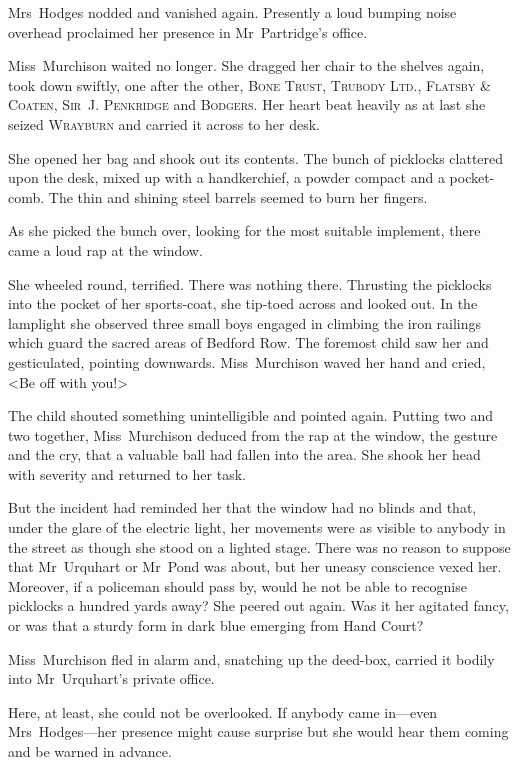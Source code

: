 Mrs~Hodges nodded and vanished again. Presently a loud bumping noise overhead proclaimed her presence in Mr~Partridge's office.

Miss~Murchison waited no longer. She dragged her chair to the shelves again, took down swiftly, one after the other, \textsc{Bone Trust, Trubody Ltd., Flatsby \& Coaten, Sir~J. Penkridge} and \textsc{Bodgers}. Her heart beat heavily as at last she seized \textsc{Wrayburn} and carried it across to her desk.

She opened her bag and shook out its contents. The bunch of picklocks clattered upon the desk, mixed up with a handkerchief, a powder compact and a pocket-comb. The thin and shining steel barrels seemed to burn her fingers.

As she picked the bunch over, looking for the most suitable implement, there came a loud rap at the window.

She wheeled round, terrified. There was nothing there. Thrusting the picklocks into the pocket of her sports-coat, she tip-toed across and looked out. In the lamplight she observed three small boys engaged in climbing the iron railings which guard the sacred areas of Bedford Row. The foremost child saw her and gesticulated, pointing downwards. Miss~Murchison waved her hand and cried, <Be off with you!>

The child shouted something unintelligible and pointed again. Putting two and two together, Miss~Murchison deduced from the rap at the window, the gesture and the cry, that a valuable ball had fallen into the area. She shook her head with severity and returned to her task.

But the incident had reminded her that the window had no blinds and that, under the glare of the electric light, her movements were as visible to anybody in the street as though she stood on a lighted stage. There was no reason to suppose that Mr~Urquhart or Mr~Pond was about, but her uneasy conscience vexed her. Moreover, if a policeman should pass by, would he not be able to recognise picklocks a hundred yards away? She peered out again. Was it her agitated fancy, or was that a sturdy form in dark blue emerging from Hand Court?

Miss~Murchison fled in alarm and, snatching up the deed-box, carried it bodily into Mr~Urquhart's private office.

Here, at least, she could not be overlooked. If anybody came in—even Mrs~Hodges—her presence might cause surprise but she would hear them coming and be warned in advance.

